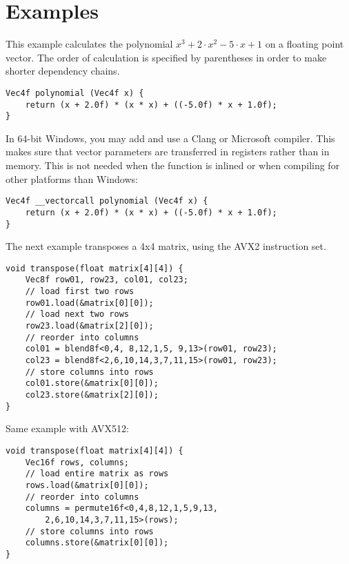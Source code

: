 \documentclass[vcl_manual.tex]{subfiles}
\begin{document}
\chapter{Examples}\label{chap:Examples}
\flushleft

This example calculates the polynomial $x^3 + 2\cdot x^2 - 5\cdot x + 1$ on a floating point vector. The order of calculation is specified by parentheses in order to make shorter dependency chains.

\begin{example}
\label{examplePolynomial}
\end{example}
\begin{lstlisting}[frame=single]
Vec4f polynomial (Vec4f x) {
    return (x + 2.0f) * (x * x) + ((-5.0f) * x + 1.0f);
}
\end{lstlisting}

In 64-bit Windows, you may add  and use a Clang or Microsoft compiler. This makes sure that vector parameters are transferred in registers rather than in memory. This is not needed when the function is inlined or when compiling for other platforms than Windows:

\begin{example}
\label{examplePolynomialVectorcall}
\end{example}
\begin{lstlisting}[frame=single]
Vec4f __vectorcall polynomial (Vec4f x) {
    return (x + 2.0f) * (x * x) + ((-5.0f) * x + 1.0f);
}
\end{lstlisting}


The next example transposes a 4x4 matrix, using the AVX2 instruction set.

\begin{example}
\label{exampleTranspose4x4}
\end{example}
\begin{lstlisting}[frame=single]
void transpose(float matrix[4][4]) {
    Vec8f row01, row23, col01, col23;
    // load first two rows
    row01.load(&matrix[0][0]);
    // load next two rows
    row23.load(&matrix[2][0]);
    // reorder into columns
    col01 = blend8f<0,4, 8,12,1,5, 9,13>(row01, row23);
    col23 = blend8f<2,6,10,14,3,7,11,15>(row01, row23);
    // store columns into rows
    col01.store(&matrix[0][0]);
    col23.store(&matrix[2][0]);
}
\end{lstlisting}

Same example with AVX512:

\begin{example}
\label{exampleTranspose4x4avx512}
\end{example}
\begin{lstlisting}[frame=single]
void transpose(float matrix[4][4]) {
    Vec16f rows, columns;
    // load entire matrix as rows
    rows.load(&matrix[0][0]);
    // reorder into columns
    columns = permute16f<0,4,8,12,1,5,9,13,
        2,6,10,14,3,7,11,15>(rows);
    // store columns into rows
    columns.store(&matrix[0][0]);
}
\end{lstlisting}
\end{document}
